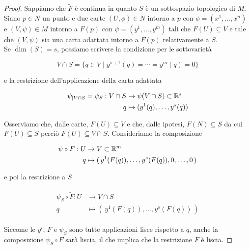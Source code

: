 \begin{proof}
	Sappiamo che $ \tilde{F} $ è continua in quanto $ S $ è un sottospazio topologico di $ M $.\\
	Siano $ p \in N $ un punto e due carte $ (U,\phi) \in N $ intorno a $ p $ con $ \phi = (x^{1},\dots,x^{n}) $ e $ (V,\psi) \in M $ intorno a $ F(p) $ con $ \psi = (y^{1},\dots,y^{m}) $ tali che $ F(U) \subseteq V $ e tale che $ (V,\psi) $ sia una carta adattata intorno a $ F(p) $ relativamente a $ S $.\\
	Se $ \dim(S)=s $, possiamo scrivere la condizione per le sottovarietà
	
	\begin{equation}
		V \cap S = \{ q \in V \mid y^{s+1}(q) = \cdots = y^{m}(q) = 0 \}
	\end{equation}

	e la restrizione dell'applicazione della carta adattata
	
	\begin{align}
		\begin{split}
			\psi_{|V \cap S} = \psi_{S} : V \cap S &\to \psi(V \cap S) \subset \mathbb{R}^{s}\\
			q &\mapsto (y^{1}(q),\dots,y^{s}(q))
		\end{split}
	\end{align}

	Osserviamo che, dalle carte, $ F(U) \subseteq V $ e che, dalle ipotesi, $ F(N) \subseteq S $ da cui $ F(U) \subseteq S $ perciò $ F(U) \subseteq V \cap S $. Consideriamo la composizione
	
	\begin{align}
		\begin{split}
			\psi \circ F : U &\to V \subset \mathbb{R}^{m}\\
			q &\mapsto ( \, y^{1}(F(q)), \dots, y^{s}(F(q)), 0,\dots, 0 \, )
		\end{split}
	\end{align}

	e poi la restrizione a $ S $
	
	\begin{align}
		\begin{split}
			\psi_{S} \circ \tilde{F} : U &\to V \cap S\\
			q &\mapsto ( \, y^{1}(F(q)), \dots, y^{s}(F(q)) \, )
		\end{split}
	\end{align}

	Siccome le $ y^{i} $, $ F $ e $ \psi_{S} $ sono tutte applicazioni lisce rispetto a $ q $, anche la composizione $ \psi_{S} \circ \tilde{F} $ sarà liscia, il che implica che la restrizione $ \tilde{F} $ è liscia.
\end{proof}

